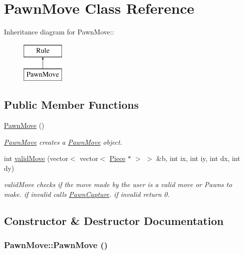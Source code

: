 \hypertarget{classPawnMove}{
\section{PawnMove Class Reference}
\label{classPawnMove}
}
Inheritance diagram for PawnMove::\begin{figure}[H]
\begin{center}
\leavevmode
\includegraphics[height=2cm]{classPawnMove}
\end{center}
\end{figure}
\subsection*{Public Member Functions}
\begin{DoxyCompactItemize}
\item 
\hyperlink{classPawnMove_ab0b45a34a1c124f8f852ad6ce512bdcc}{PawnMove} ()
\begin{DoxyCompactList}\small\item\em \hyperlink{classPawnMove}{PawnMove} creates a \hyperlink{classPawnMove}{PawnMove} object. \item\end{DoxyCompactList}\item 
int \hyperlink{classPawnMove_a9280b4befe12bc9439d60ad7765187af}{validMove} (vector$<$ vector$<$ \hyperlink{classPiece}{Piece} $\ast$ $>$ $>$ \&b, int ix, int iy, int dx, int dy)
\begin{DoxyCompactList}\small\item\em validMove checks if the move made by the user is a valid move or Pawns to make. if invalid calls \hyperlink{classPawnCapture}{PawnCapture}. if invalid return 0. \item\end{DoxyCompactList}\end{DoxyCompactItemize}


\subsection{Constructor \& Destructor Documentation}
\hypertarget{classPawnMove_ab0b45a34a1c124f8f852ad6ce512bdcc}{
\subsubsection[{PawnMove}]{\setlength{\rightskip}{0pt plus 5cm}PawnMove::PawnMove ()}}
\label{classPawnMove_ab0b45a34a1c124f8f852ad6ce512bdcc}



